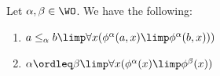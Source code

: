 \begin{proposition}
\label{prop:approximants-are-inflationary}
Let $\alpha,\beta \in \WO$. We have the following:
\begin{enumerate}
    \item\label{item:bdd-approximants-are-inflationary} $a\leq_\alpha b \limp \forall x (\phi^\alpha(a,x) \limp \phi^\alpha(b,x)) )$
    \item\label{item:approximants-are-inflationary} $\alpha \ordleq \beta \limp \forall x (\phi^\alpha(x) \limp \phi^\beta(x))$
\end{enumerate}
\end{proposition}
